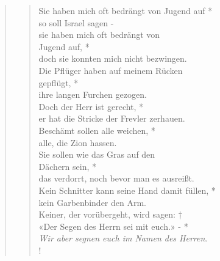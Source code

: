 

\begin{quote}
\begin{verse}

\smallskip

Sie haben mich oft bedrängt von Jugend auf *\\
so soll Israel sagen -\\ \vin
sie haben mich oft bedrängt von \\ \vin Jugend auf, *\\ \vin
doch sie konnten mich nicht bezwingen.\\ 
Die Pflüger haben auf meinem Rücken \\ gepflügt, *\\
ihre langen Furchen gezogen.\\ \vin 
Doch der Herr ist gerecht, *\\ \vin
er hat die Stricke der Frevler zerhauen.\\
Beschämt sollen alle weichen, *\\
alle, die Zion hassen.\\ \vin
Sie sollen wie das Gras auf den \\ \vin Dächern sein, *\\ \vin
das verdorrt, noch bevor man es ausreißt.\\ 
Kein Schnitter kann seine Hand damit füllen, *\\
kein Garbenbinder den Arm.\\ \vin
Keiner, der vorübergeht, wird sagen: †\\ \vin
«Der Segen des Herrn sei mit euch.» - *\\ \vin \textit{Wir aber segnen euch im Namen des Herren}.\\ !

\end{verse}

\begin{verse}

\newpage


\smallskip


\end{verse}
\end{quote}
